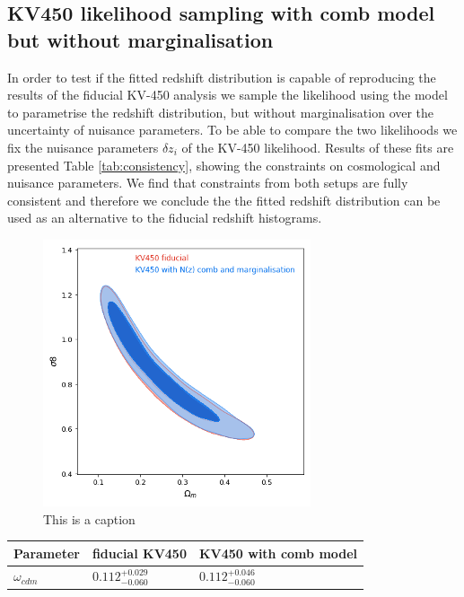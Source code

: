 \documentclass{aa}
\begin{document}
\begin{appendix}
\section{KV450 likelihood sampling with comb model but without marginalisation}
\label{ap:kv450_likelihood}
In order to test if the fitted redshift distribution is capable of reproducing the results of the fiducial KV-450 analysis we sample the likelihood using the model to parametrise the redshift distribution, but without marginalisation over the uncertainty of nuisance parameters. To be able to compare the two likelihoods we fix the nuisance parameters $\delta z_i$ of the KV-450 likelihood. Results of these fits are presented Table \ref{tab:consistency}, showing the constraints on cosmological and nuisance parameters. We find that constraints from both setups are fully consistent and therefore we conclude the the fitted redshift distribution can be used as an alternative to the fiducial redshift histograms.

\begin{figure}
\centering
\includegraphics[width=\linewidth]{plots/Om_s8.png}
\caption{{\color{red} This is a caption}}
\label{fig:Om_s8_consistency}
\end{figure}

\begin{table}
\begin{tabular}{lll}
\hline
\hline
Parameter & fiducial KV450 & KV450 with comb model\\
\hline
$\omega_{cdm }  $ & $0.112^{+0.029}_{-0.060}   $& $0.112^{+0.046}_{-0.060}   $\\


\end{tabular}
\end{table}
\end{appendix}
\end{document}
